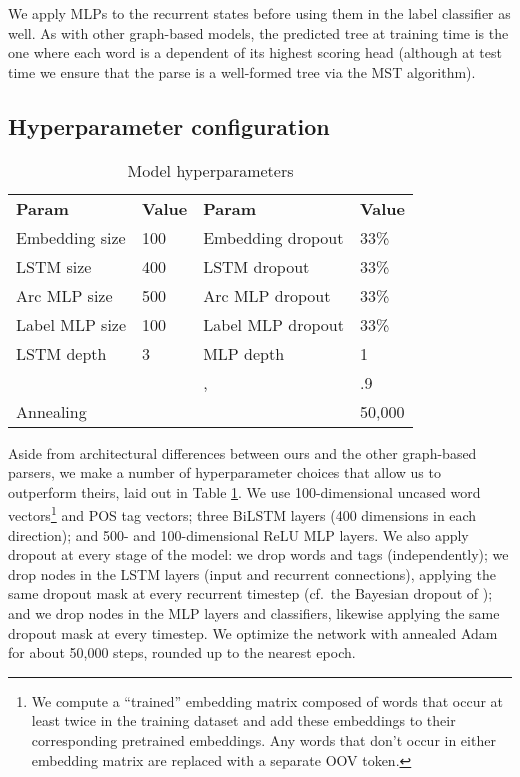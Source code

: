 \documentclass[11pt,a4paper]{article}
\begin{document}
We apply MLPs to the recurrent states before using them in the label classifier as well. As with other graph-based models, the predicted tree at training time is the one where each word is a dependent of its highest scoring head (although at test time we ensure that the parse is a well-formed tree via the MST algorithm).

\subsection{Hyperparameter configuration}
\begin{table}[ht]
  \begin{center}\small
  \begin{tabular}{llll}
    \bf Param & \bf Value & \bf Param & \bf Value\\
    Embedding size & 100 & Embedding dropout & 33\%\\
    LSTM size & 400 & LSTM dropout & 33\%\\
    Arc MLP size & 500 & Arc MLP dropout & 33\%\\
    Label MLP size & 100 & Label MLP dropout & 33\%\\
    LSTM depth & 3 & MLP depth & 1\\
     &  & , & .9 \\
    Annealing &  &  & 50,000
  \end{tabular}
  \caption{Model hyperparameters}
  \label{Hyperparams}
  \end{center}
\end{table}

Aside from architectural differences between ours and the other graph-based parsers, we make a number of hyperparameter choices that allow us to outperform theirs, laid out in Table \ref{Hyperparams}. We use 100-dimensional uncased word vectors\footnote{We compute a ``trained'' embedding matrix composed of words that occur at least twice in the training dataset and add these embeddings to their corresponding pretrained embeddings. Any words that don't occur in either embedding matrix are replaced with a separate OOV token.} and POS tag vectors; three BiLSTM layers (400 dimensions in each direction); and 500- and 100-dimensional ReLU MLP layers. We also apply dropout at every stage of the model: we drop words and tags (independently); we drop nodes in the LSTM layers (input and recurrent connections), applying the same dropout mask at every recurrent timestep (cf.\ the Bayesian dropout of \citet{GalGhaharmani2015}); and we drop nodes in the MLP layers and classifiers, likewise applying the same dropout mask at every timestep. We optimize the network with annealed Adam \citep{KingmaBa2014} for about 50,000 steps, rounded up to the nearest epoch.
\end{document}

